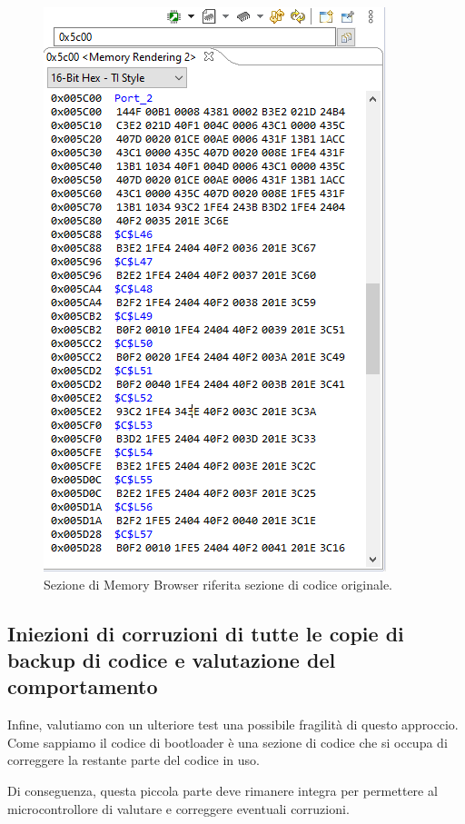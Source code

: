 \documentclass[LaM,binding=0.6cm]{../sapthesis}
\begin{document}
\begin{figure}[htbp]
\centerline{\includegraphics[scale=0.55]{examples/BootloaderTestCorruzioni1.PNG}}
\caption{Sezione di Memory Browser riferita sezione di codice originale.}
\label{fig}
\end{figure}


\subsection{Iniezioni di corruzioni di tutte le copie di backup di codice e valutazione del comportamento }

Infine, valutiamo con un ulteriore test una possibile fragilità di questo approccio. Come sappiamo il codice di bootloader è una sezione di codice che si occupa di correggere la restante parte del
codice in uso.

Di conseguenza, questa piccola parte deve rimanere integra per permettere al microcontrollore di valutare e correggere eventuali corruzioni.
\end{document}
